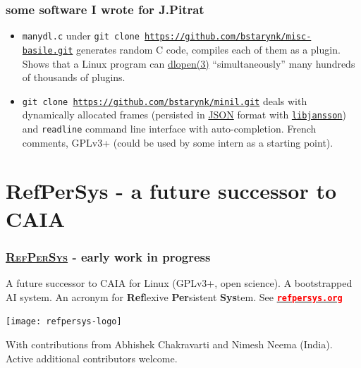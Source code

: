 \documentclass[xcolor=svgnames,final,smaller,a4]{beamer}
\newcommand{\RefPerSys}{\href{http://refpersys.org}{\textsc{RefPerSys}}}
\begin{document}
 \begin{frame}
   \frametitle{some software I wrote for J.Pitrat}

   \begin{itemize}
     \item \texttt{manydl.c} under \texttt{git clone
       \href{https://github.com/bstarynk/misc-basile.git}{https://github.com/bstarynk/misc-basile.git}}
       generates random C code, compiles each of them as a
       plugin. Shows that a Linux program can
       \href{http://man7.org/linux/man-pages/man3/dlopen.3.html}{dlopen(3)}
       ``simultaneously'' many hundreds of thousands of plugins.

    \item\texttt{git clone
      \href{https://github.com/bstarynk/minil.git}{https://github.com/bstarynk/minil.git}}
      deals with dynamically allocated frames (persisted in
      \href{http://json.org}{JSON} format with
      \href{http://www.digip.org/jansson/}{\texttt{libjansson}}) and
      \texttt{readline} command line interface with
      auto-completion. French comments, GPLv3+ (could be used by some
      intern as a starting point).
      
   \end{itemize}
 \end{frame}


   \section{RefPerSys - a future successor to CAIA}
   \label{sec:refpersys}

  \begin{frame}
     \frametitle{{\RefPerSys} - early work in progress}

     A future successor to CAIA for Linux (GPLv3+, open science). A bootstrapped AI system. An acronym for \textbf{Ref}lexive \textbf{Per}sistent \textbf{Sys}tem. See \href{http://refpersys.org/}{\large\texttt{\textbf{\textcolor{red}{refpersys.org}}}}

     \begin{center}
       \texttt{[image: refpersys-logo]} \\
     \end{center}
     
     With contributions from Abhishek Chakravarti and Nimesh Neema (India). Active additional contributors welcome.
     
 \end{frame}
 
  
\end{document}
